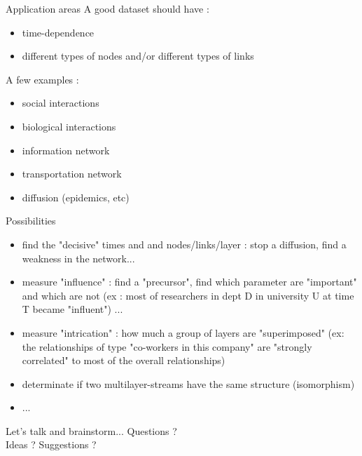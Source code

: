 \documentclass[15pt]{beamer}
\begin{document}
\begin{frame}{Application areas}
A good dataset should have :
\begin{itemize}
    \item time-dependence
    \item different types of nodes and/or different types of links
\end{itemize}
A few examples :
\begin{itemize}
    \item social interactions
    \item biological interactions
    \item information network
    \item transportation network
    \item diffusion (epidemics, etc)
\end{itemize}
\end{frame}
\begin{frame}{Possibilities}
 
\begin{itemize}
\pause
    \item find the "decisive" times and and nodes/links/layer : stop a diffusion, find a weakness in the network...
    \pause
    \item measure "influence" : find a "precursor", find which parameter are "important" and which are not (ex : most of researchers in dept D in university U at time T became "influent") ...\pause
    \item measure "intrication" : how much a group of layers are "superimposed" (ex: the relationships of type "co-workers in this company" are "strongly correlated" to most of the overall relationships)\pause
    \item determinate if two multilayer-streams have the same structure (isomorphism)
    \pause
    \item ...
\end{itemize}
    
\end{frame}

\begin{frame}{Let's talk and brainstorm...}
    Questions ?
    \\
    Ideas ? Suggestions ?
\end{frame}
\end{document}

